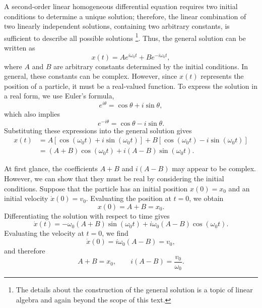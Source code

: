 \documentclass[12pt]{article}
\begin{document}
A second-order linear homogeneous differential equation requires two initial conditions to determine a unique solution; therefore, the linear combination of two linearly independent solutions, containing two arbitrary constants, is sufficient to describe all possible solutions \footnote{The details about the construction of the general solution is a topic of linear algebra and again beyond the scope of this text.}. Thus, the general solution can be written as
\begin{equation}
    x(t)=Ae^{i\omega_0 t}+Be^{-i\omega_0 t},
\end{equation}
where $A$ and $B$ are arbitrary constants determined by the initial conditions. In general, these constants can be complex. However, since $x(t)$ represents the position of a particle, it must be a real-valued function. To express the solution in a real form, we use Euler's formula,
\begin{equation}
    e^{i\theta}=\cos\theta+i\sin\theta,
\end{equation}
which also implies
\begin{equation}
    e^{-i\theta}=\cos\theta-i\sin\theta.
\end{equation}
Substituting these expressions into the general solution gives
\begin{align}
    x(t)
    &=A\left[\cos(\omega_0 t)+i\sin(\omega_0 t)\right]
    +B\left[\cos(\omega_0 t)-i\sin(\omega_0 t)\right]
    \nonumber\\
    &=(A+B)\cos(\omega_0 t)
    +i(A-B)\sin(\omega_0 t).
\end{align}

At first glance, the coefficients $A+B$ and $i(A-B)$ may appear to be complex. However, we can show that they must be real by considering the initial conditions. Suppose that the particle has an initial position $x(0)=x_0$ and an initial velocity $\dot{x}(0)=v_0$. Evaluating the position at $t=0$, we obtain
\begin{equation}
    x(0)=A+B=x_0.
\end{equation}
Differentiating the solution with respect to time gives
\begin{equation}
    \dot{x}(t)
    =-\omega_0(A+B)\sin(\omega_0 t)
    +i\omega_0(A-B)\cos(\omega_0 t).
\end{equation}
Evaluating the velocity at $t=0$, we find
\begin{equation}
    \dot{x}(0)=i\omega_0(A-B)=v_0,
\end{equation}
and therefore
\begin{equation}
    A+B=x_0,
    \qquad
    i(A-B)=\frac{v_0}{\omega_0}.
\end{equation}
\end{document}
